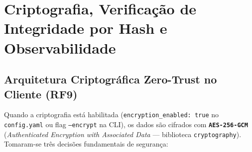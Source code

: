 \documentclass[10pt,a4paper]{article}
\begin{document}
\section{Criptografia, Verificação de Integridade por Hash e Observabilidade}

\subsection{Arquitetura Criptográfica Zero-Trust no Cliente (RF9)}
Quando a criptografia está habilitada (\texttt{encryption\_enabled: true} no \texttt{config.yaml} ou flag \texttt{--encrypt} na CLI), os dados são cifrados com \textbf{\texttt{AES-256-GCM}} (\textit{Authenticated Encryption with Associated Data} — biblioteca \texttt{cryptography}). Tomaram-se três decisões fundamentais de segurança:
\end{document}

